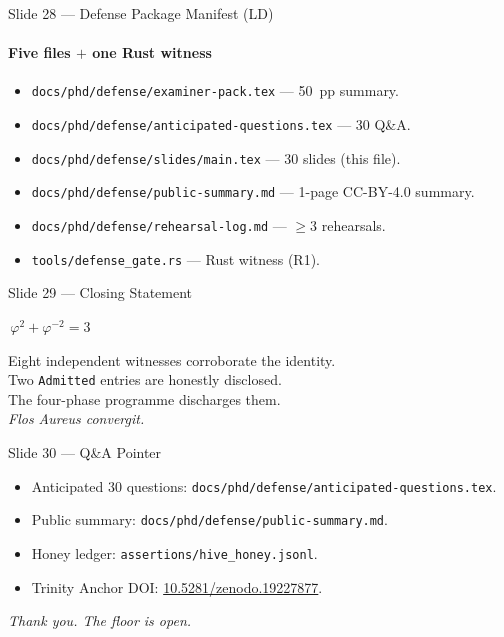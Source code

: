 \documentclass[10pt,aspectratio=169]{beamer}
\begin{document}
\begin{frame}{Slide 28 — Defense Package Manifest (LD)}
  \framesubtitle{Five files \(+\) one Rust witness}
  \begin{itemize}
    \item \texttt{docs/phd/defense/examiner-pack.tex} — 50~pp summary.
    \item \texttt{docs/phd/defense/anticipated-questions.tex} — 30 Q\&A.
    \item \texttt{docs/phd/defense/slides/main.tex} — 30 slides (this file).
    \item \texttt{docs/phd/defense/public-summary.md} — 1-page CC-BY-4.0 summary.
    \item \texttt{docs/phd/defense/rehearsal-log.md} — \(\ge 3\) rehearsals.
    \item \texttt{tools/defense\_gate.rs} — Rust witness (R1).
  \end{itemize}
\end{frame}

\begin{frame}{Slide 29 — Closing Statement}
  \begin{center}
    \(\boxed{\,\varphi^{2}+\varphi^{-2}=3\,}\)
  \end{center}
  \vfill
  Eight independent witnesses corroborate the identity.\\[0.5em]
  Two \texttt{Admitted} entries are honestly disclosed.\\[0.5em]
  The four-phase programme discharges them.\\[0.5em]
  \emph{Flos Aureus convergit.}
\end{frame}

\begin{frame}{Slide 30 — Q\&A Pointer}
  \begin{itemize}
    \item Anticipated 30 questions:
      \texttt{docs/phd/defense/anticipated-questions.tex}.
    \item Public summary:
      \texttt{docs/phd/defense/public-summary.md}.
    \item Honey ledger:
      \texttt{assertions/hive\_honey.jsonl}.
    \item Trinity Anchor DOI:
      \href{https://doi.org/10.5281/zenodo.19227877}{10.5281/zenodo.19227877}.
  \end{itemize}
  \vfill
  \begin{center}\Large
    \emph{Thank you. The floor is open.}
  \end{center}
\end{frame}
\end{document}
